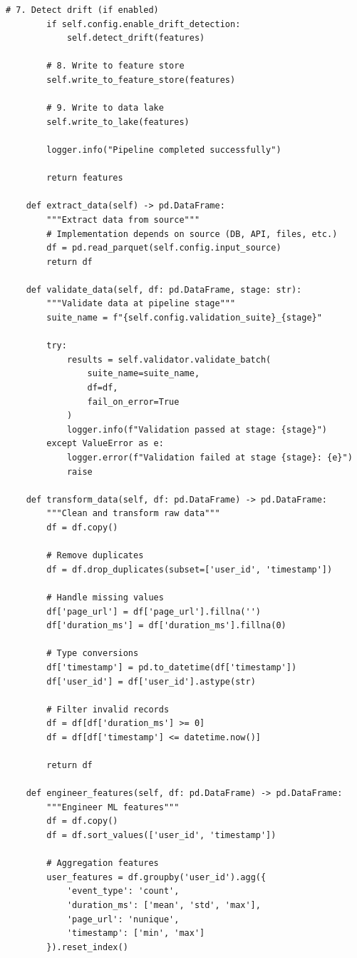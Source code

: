 \begin{lstlisting}[style=python, caption=Complete production data pipeline]
        # 7. Detect drift (if enabled)
        if self.config.enable_drift_detection:
            self.detect_drift(features)

        # 8. Write to feature store
        self.write_to_feature_store(features)

        # 9. Write to data lake
        self.write_to_lake(features)

        logger.info("Pipeline completed successfully")

        return features

    def extract_data(self) -> pd.DataFrame:
        """Extract data from source"""
        # Implementation depends on source (DB, API, files, etc.)
        df = pd.read_parquet(self.config.input_source)
        return df

    def validate_data(self, df: pd.DataFrame, stage: str):
        """Validate data at pipeline stage"""
        suite_name = f"{self.config.validation_suite}_{stage}"

        try:
            results = self.validator.validate_batch(
                suite_name=suite_name,
                df=df,
                fail_on_error=True
            )
            logger.info(f"Validation passed at stage: {stage}")
        except ValueError as e:
            logger.error(f"Validation failed at stage {stage}: {e}")
            raise

    def transform_data(self, df: pd.DataFrame) -> pd.DataFrame:
        """Clean and transform raw data"""
        df = df.copy()

        # Remove duplicates
        df = df.drop_duplicates(subset=['user_id', 'timestamp'])

        # Handle missing values
        df['page_url'] = df['page_url'].fillna('')
        df['duration_ms'] = df['duration_ms'].fillna(0)

        # Type conversions
        df['timestamp'] = pd.to_datetime(df['timestamp'])
        df['user_id'] = df['user_id'].astype(str)

        # Filter invalid records
        df = df[df['duration_ms'] >= 0]
        df = df[df['timestamp'] <= datetime.now()]

        return df

    def engineer_features(self, df: pd.DataFrame) -> pd.DataFrame:
        """Engineer ML features"""
        df = df.copy()
        df = df.sort_values(['user_id', 'timestamp'])

        # Aggregation features
        user_features = df.groupby('user_id').agg({
            'event_type': 'count',
            'duration_ms': ['mean', 'std', 'max'],
            'page_url': 'nunique',
            'timestamp': ['min', 'max']
        }).reset_index()


\end{lstlisting}
